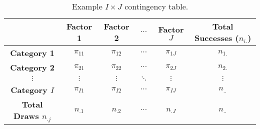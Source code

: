 \documentclass{article}
\begin{document}
\begin{table}[H]
    \centering
    \begin{tabular}{c c c c c c}
        \toprule
                                        & \textbf{Factor 1} & \textbf{Factor 2} & \(\cdots\) & \textbf{Factor \(J\)} & \textbf{Total Successes (\(n_{i.}\))} \\
        \midrule
        \textbf{Category 1}             & \(\pi_{11}\)      & \(\pi_{12}\)      & \(\cdots\) & \(\pi_{1J}\)          & \(n_{1.}\)                            \\
        \textbf{Category 2}             & \(\pi_{21}\)      & \(\pi_{22}\)      & \(\cdots\) & \(\pi_{2J}\)          & \(n_{2.}\)                            \\
        \(\vdots\)                      & \(\vdots\)        & \(\vdots\)        & \(\ddots\) & \(\vdots\)            & \(\vdots\)                            \\
        \textbf{Category \(I\)}         & \(\pi_{I1}\)      & \(\pi_{I2}\)      & \(\cdots\) & \(\pi_{IJ}\)          & \(n_{..}\)                            \\
        \textbf{Total Draws \(n_{.j}\)} & \(n_{.1}\)        & \(n_{.2}\)        & \(\cdots\) & \(n_{.J}\)            & \(n_{..}\)                            \\
        \bottomrule
    \end{tabular}
    \caption{Example \(I \times J\) contingency table.} %
\end{table}
\end{document}
